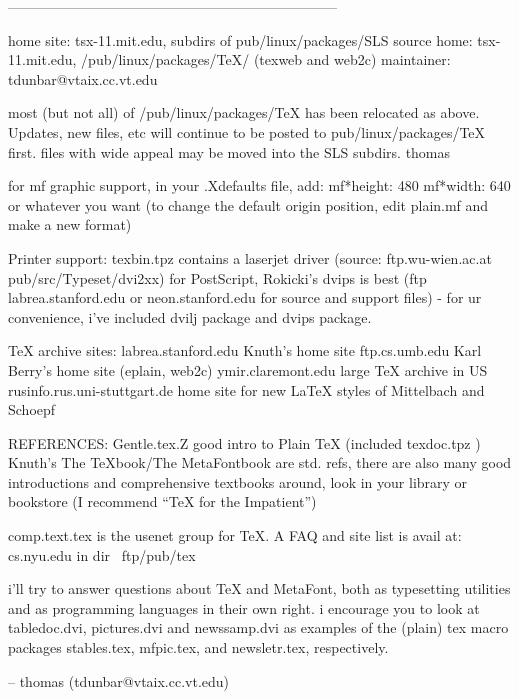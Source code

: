-----------------------------------------------------------------------

home site:   tsx-11.mit.edu, subdirs of pub/linux/packages/SLS
source home: tsx-11.mit.edu, /pub/linux/packages/TeX/  (texweb and web2c)
maintainer:  tdunbar@vtaix.cc.vt.edu

 most (but not all) of /pub/linux/packages/TeX has been relocated as above.
   Updates, new files, etc will continue to be posted to pub/linux/packages/TeX
     first. files with wide appeal may be moved into the SLS subdirs.
                                               thomas              


 for mf graphic support, in your .Xdefaults file, add:
    mf*height: 480
    mf*width:  640
   or whatever you want (to change the default origin position,
    edit plain.mf and make a new format)
 
 Printer support: texbin.tpz contains a laserjet driver (source: 
                  ftp.wu-wien.ac.at pub/src/Typeset/dvi2xx)
                    for PostScript, Rokicki's dvips is best
                    (ftp labrea.stanford.edu or neon.stanford.edu
                      for source and support files)
                  - for ur convenience, i've included dvilj package
                    and dvips package.


 TeX archive sites:
    labrea.stanford.edu             Knuth's home site
    ftp.cs.umb.edu                  Karl Berry's home site (eplain, web2c)
    ymir.claremont.edu              large TeX archive in US
    rusinfo.rus.uni-stuttgart.de    home site for new LaTeX styles
                                      of Mittelbach and Schoepf


REFERENCES:
      Gentle.tex.Z   good intro to Plain TeX (included texdoc.tpz )
      Knuth's The TeXbook/The MetaFontbook are std. refs, there are also
        many good introductions and comprehensive textbooks around,
        look in your library or bookstore (I recommend ``TeX for
        the Impatient'')
 
 comp.text.tex is the usenet group for TeX. 
 A FAQ and site list is avail at: cs.nyu.edu in dir ~ftp/pub/tex
 
 i'll try to answer questions about TeX and MetaFont, both as typesetting
utilities and as programming languages in their own right.
  i encourage you to look at tabledoc.dvi, pictures.dvi and
newssamp.dvi as examples of the (plain) tex macro packages
stables.tex, mfpic.tex, and newsletr.tex, respectively. 

 -- thomas (tdunbar@vtaix.cc.vt.edu)
